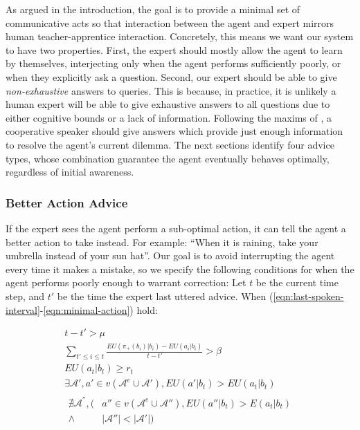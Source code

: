 \documentclass{article}
\begin{document}
	As argued in the introduction, the goal is to provide a minimal set of communicative acts so that interaction between the agent and expert mirrors human teacher-apprentice interaction. Concretely, this means we want our system to have two properties. First, the expert should mostly allow the agent to learn by themselves, interjecting only when the agent performs sufficiently poorly, or when they explicitly ask a question. Second, our expert should be able to give \emph{non-exhaustive} answers to queries. This is because, in practice, it is unlikely a human expert will be able to give exhaustive answers to all questions due to either cognitive bounds or a lack of information. Following the maxims of \citet{grice_logic_1975}, a cooperative speaker should give answers which provide just enough information to resolve the agent's current dilemma. The next sections identify four advice types, whose combination guarantee the agent eventually behaves optimally, regardless of initial awareness.
	\subsubsection{Better Action Advice}
	
	If the expert sees the agent perform a sub-optimal action, it can tell the agent a better action to take instead. For example: ``When it is raining, take your umbrella instead of your sun hat''. Our goal is to avoid interrupting the agent every time it makes a mistake, so we specify the following conditions for when the agent performs poorly enough to warrant correction: Let $t$ be the current time step, and $t'$ be the time the expert last uttered advice. When (\ref{eqn:last-spoken-interval}-\ref{eqn:minimal-action}) hold:
	
	\begin{gather}
	\label{eqn:last-spoken-interval}
	t-t' > \mu \\
	\label{eqn:suboptimal-performance}
	\sum_{t' \leq i \leq t} \frac{EU(\pi_+(b_i) | b_i) - EU(a_i | b_i)}{t - t'} > \beta \\
	\label{eqn:reward-below-expected}
	EU(a_t|b_t) \geq r_t \\
	\label{eqn:better-action-available}
	\exists \mathcal{A}',a' \in v(\mathcal{A}^e \cup \mathcal{A}'), EU(a' | b_t) > EU(a_t | b_t) \\
	\label{eqn:minimal-action}
	\begin{aligned}
	\nexists \mathcal{A}^{''}, (&a'' \in v(\mathcal{A}^e \cup \mathcal{A}''), EU(a{''} | b_t) > E(a_t | b_t) \\
	\wedge\ &|\mathcal{A}''| < |\mathcal{A}'|)
	\end{aligned}
	\end{gather}
	
\end{document}
